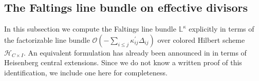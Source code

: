 \documentclass{amsart}
\numberwithin{equation}{section}
\numberwithin{figure}{section}
\theoremstyle{definition}
\theoremstyle{remark}
\renewcommand{\c}[1]{\mathcal{#1}}
\renewcommand{\b}[1]{\mathbb{#1}}
\begin{document}
\subsection{The Faltings line bundle on effective divisors}
\label{subsec:faltings-local-line}

In this subsection we compute the Faltings line bundle $\b L^\kappa$ explicitly in terms of the factorizable line bundle \(\c O(-\sum_{i\le j}\kappa_{ij}^\prime\Delta_{ij})\) over colored Hilbert scheme $\c H_{C\times I}$. An equivalent formulation has already been announced in \cite[lemma~17.3]{GaitsgoryCFT} in terms of Heisenberg central extensions. Since we do not know a written proof of this identification, we include one here for completeness. 
\end{document}
